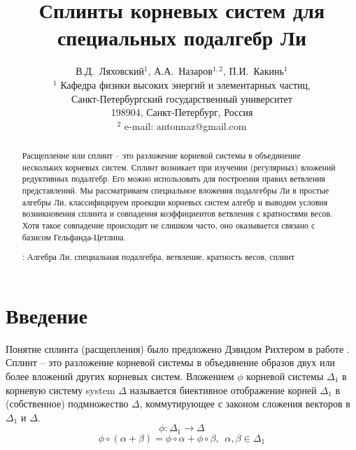 \documentclass[12pt]{article}
\begin{document}
\title{Сплинты корневых систем для специальных подалгебр Ли}

\author{В.Д.~Ляховский$^1$, А.А.~Назаров$^{1,2}$, П.И.~Какинь$^{1}$\\
  {\small $^1$ Кафедра физики высоких энергий и элементарных частиц,}\\ {\small Санкт-Петербургский государственный университет}\\
  {\small 198904, Санкт-Петербург, Россия}\\
  {\small $^{2}$ e-mail: antonnaz@gmail.com}}

\maketitle

\begin{abstract}
  Расщепление или сплинт -- это разложение корневой системы в объединение нескольких корневых
  систем. Сплинт возникает при изучении (регулярных) вложений редуктивных подалгебр. Его можно
  использовать для построения правил ветвления представлений. Мы рассматриваем специальное вложения
  подалгебры Ли в простые алгебры Ли, классифицируем проекции корневых систем алгебр и выводим
  условия возникновения сплинта и совпадения коэффициентов ветвления с кратностями весов. Хотя
  такое совпадение происходит не слишком часто, оно оказывается связано с базисом Гельфанда-Цетлина. 

: Алгебра Ли, специальная подалгебра, ветвление, кратность весов, сплинт
\end{abstract}


\section{Введение}
\label{sec:introduction}

Понятие сплинта (расщепления) было предложено Дэвидом Рихтером в работе \cite{richter2008splints}.
Сплинт -- это разложение корневой системы в объединение образов двух или более вложений других
корневых систем. Вложением  $\phi$ корневой системы $\Delta_1$ в корневую систему  system $\Delta$
называется биективное отображение корней $\Delta_{1}$ в (собственное) подмножество  $\Delta$,
коммутирующее с  законом сложения векторов в $\Delta_{1}$ и $\Delta$.
\begin{equation*}
\phi:\Delta_1 \longrightarrow \Delta
\end{equation*}
\begin{equation*}
\phi \circ (\alpha + \beta) =\phi \circ \alpha + \phi \circ \beta,
\,\,\, \alpha,\beta \in \Delta_1
\end{equation*}
\end{document}
